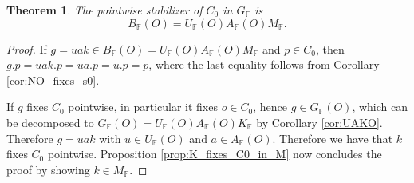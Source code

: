 \documentclass[12pt]{amsart}
\newcommand{\F}{\mathbb{F} }
\newcommand{\fraka}{\mathfrak{a}}
\newcommand{\A}{\mathbb{A}}
\newcommand{\B}{\mathcal{B}}
\numberwithin{equation}{section}
\newtheorem{theorem}{Theorem}[section]
\theoremstyle{remark} %
\begin{document}
%	
%




\begin{theorem}\label{thm:NO_fixes_s0}
	The pointwise stabilizer of $C_0$ in $G_\F$ is 
	$$B_\F(O) = U_\F(O)A_\F(O)M_\F.$$
\end{theorem}
\begin{proof}
	If $g=uak \in  B_\F(O) = U_\F(O)A_\F(O)M_\F$ and $p \in C_0$, then $g.p=uak.p=ua.p=u.p=p$, where the last equality follows from Corollary \ref{cor:NO_fixes_s0}.
	
	If $g$ fixes $C_0$ pointwise, in particular it fixes $o \in C_0$, hence $g\in G_\F(O)$, which can be decomposed to $G_\F(O) = U_\F(O)A_\F(O)K_\F$ by Corollary \ref{cor:UAKO}. Therefore $g=uak$ with $u\in U_\F(O)$ and $a \in  A_\F(O)$. Therefore we have that $k$ fixes $C_0$ pointwise. Proposition \ref{prop:K_fixes_C0_in_M} now concludes the proof by showing $k \in M_\F$.
\end{proof}
\end{document}
